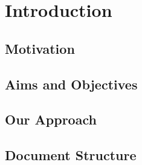 \chapter{Introduction}



\section{Motivation} %
\blindtext

\section{Aims and Objectives} 
\blindtext

\section{Our Approach} 
\blindtext

\section{Document Structure}
\blindtext
